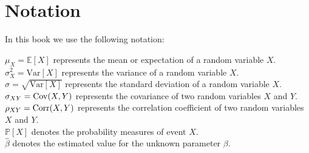 \chapter*{Notation}

In this book we use the following notation:

$\mu_X = \mathbb{E}[X]$ represents the mean or expectation of a random variable $X$.\\

$\sigma^2_X = \text{Var}[X]$ represents the variance of a random variable $X$.\\

$\sigma = \sqrt{\text{Var}[X]}$ represents the standard deviation of a random variable $X$.\\

$\sigma_{XY} = \operatorname*{Cov}(X,Y)$ represents the covariance of two random variables $X$ and $Y$.\\

$\rho_{XY} = \operatorname*{Corr}(X,Y)$ represents the correlation coefficient of two random variables $X$ and $Y$.\\

$\mathbb{P}[X]$ denotes the probability measures of event $X$.\\

$\widehat{\beta}$ denotes the estimated value for the unknown parameter $\beta$.